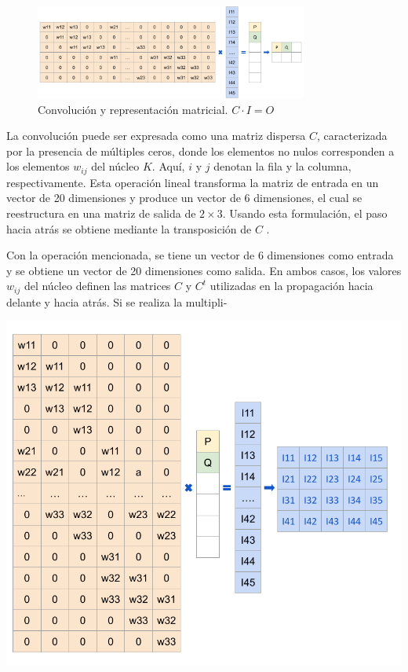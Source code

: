 \begin{figure}[h!]
    \centering
    \includegraphics[width=0.8\textwidth]{img/conv2.png}
    \caption{Convolución y representación matricial.  $C \cdot I = O$}
    \label{fig:conv2}
\end{figure}

\begin{minipage}{0.5\textwidth}
La convolución puede ser expresada como una matriz dispersa \(C\), caracterizada por la presencia de múltiples ceros, donde los elementos no nulos corresponden a los elementos $w_{ij}$ del núcleo \(K\). Aquí, \(i\) y \(j\) denotan la fila y la columna, respectivamente. Esta operación lineal transforma la matriz de entrada en un vector de 20 dimensiones y produce un vector de 6 dimensiones, el cual se reestructura en una matriz de salida de \(2 \times 3\). Usando esta formulación, el paso hacia atrás se obtiene mediante la transposición de \(C\) \citep{pajares2021aprendizaje}.


\bigskip

Con la operación mencionada, se tiene un vector de 6 dimensiones como entrada y se obtiene un vector de 20 dimensiones como salida. En ambos casos, los valores $w_{ij}$ del núcleo definen las matrices \(C\) y \(C^t\) utilizadas en la propagación hacia delante y hacia atrás. Si se realiza la multipli-
\end{minipage}
\begin{minipage}{0.05\textwidth}
	\textbf{ }	
\end{minipage}
\begin{minipage}{0.45\textwidth}
	\includegraphics[width=1.1\textwidth]{img/convT.png}
    \label{fig:convT}
\end{minipage}
